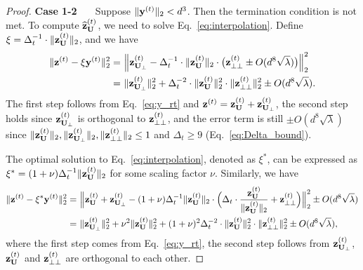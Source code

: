 \begin{proof}
\vspace{+2mm}
{\bf \noindent Case 1-2 \ \ } 
Suppose $\|\mathbf{y}^{(t)}\|_2 < d^3$. Then the termination condition is not met. 
To compute $\widehat{\mathbf{z}}_{\mathbf{U}}^{(t)}$, we need to solve Eq.~\eqref{eq:interpolation}. Define $\xi  = \Delta_{t}^{-1} \cdot \|\mathbf{z}_{\mathbf{U}}^{(t)}\|_2$, and we have
\begin{align}
\|\mathbf{z}^{(t)} - \xi \mathbf{y}^{(t)}\|_2^2 = &~ \Big\|\mathbf{z}_{\mathbf{U}_\perp}^{(t)} - \Delta_{t}^{-1} \cdot \|\mathbf{z}_{\mathbf{U}}^{(t)}\|_2 \cdot \big( \mathbf{z}_{\perp\perp}^{(t)} \pm O(d^{8}\sqrt{\lambda}) \big) \Big\|_2^2\notag \\
= &~ \|\mathbf{z}_{\mathbf{U}_\perp}^{(t)}\|_2^2 + \Delta_{t}^{-2} \cdot \|\mathbf{z}_{\mathbf{U}}^{(t)}\|_2^2 \cdot \|\mathbf{z}_{\perp\perp}^{(t)}\|_2^2 \pm O(d^{8}\sqrt{\lambda}) \label{eq:ub1}.
\end{align}
The first step follows from Eq.~\eqref{eq:y_rt} and $\mathbf{z}^{(t)} = \mathbf{z}_{\mathbf{U}}^{(t)} + \mathbf{z}_{ \mathbf{U}_{\perp}}^{(t)}$, the second step holds since $\mathbf{z}_{\mathbf{U}_\perp}^{(t)}$ is orthogonal to $\mathbf{z}_{ \perp\perp}^{(t)}$, and the error term is still $\pm O(d^8 \sqrt{\lambda})$ since $\|\mathbf{z}_{\mathbf{U}}^{(t)}\|_2, \|\mathbf{z}_{\mathbf{U}_{\perp}}^{(t)}\|_2, \|\mathbf{z}_{\perp\perp}^{(t)}\|_2 \leq 1$ and $\Delta_{t} \geq 9$ (Eq.~\eqref{eq:Delta_bound}). 


The optimal solution to Eq.~\eqref{eq:interpolation}, denoted as $\xi^{*}$, can be expressed as $\xi^{*} = (1 + \nu)\Delta_t^{-1} \|\mathbf{z}_{\mathbf{U}}^{(t)}\|_2$ for some scaling factor $\nu$. Similarly, we have
\begin{align}
\|\mathbf{z}^{(t)} - \xi^{*}\mathbf{y}^{(t)}\|_2^2 = &~ \Big\|\mathbf{z}_{\mathbf{U}}^{(t)} + \mathbf{z}_{\mathbf{U}_\perp}^{(t)} - (1 + \nu)\Delta_t^{-1}\|\mathbf{z}_{\mathbf{U}}^{(t)}\|_2 \cdot \Big(\Delta_{t}\cdot  \frac{\mathbf{z}^{(t)}_{\mathbf{U}}}{\|\mathbf{z}_{\mathbf{U}}^{(t)}\|_2} + \mathbf{z}_{\perp\perp}^{(t)}\Big)   \Big\|_2^2 \pm O(d^8\sqrt{\lambda}) \notag \\
= &~ \|\mathbf{z}_{\mathbf{U}_\perp}^{(t)}\|_2^2 + \nu^2 \|\mathbf{z}_{\mathbf{U}}^{(t)}\|_2^2 + (1+\nu)^2 \Delta_{t}^{-2} \cdot \|\mathbf{z}_{\mathbf{U}}^{(t)}\|_2^2 \cdot \|\mathbf{z}_{\perp\perp}^{(t)}\|_2^2 \pm O(d^{8}\sqrt{\lambda}),\label{eq:ub2}
\end{align}
where the first step comes from Eq.~\eqref{eq:y_rt}, the second step follows from $\mathbf{z}_{\mathbf{U}_{\perp}}^{(t)}$, $\mathbf{z}_{\mathbf{U}}^{(t)}$ and $\mathbf{z}^{(t)}_{\perp\perp}$ are orthogonal to each other.



\end{proof}
